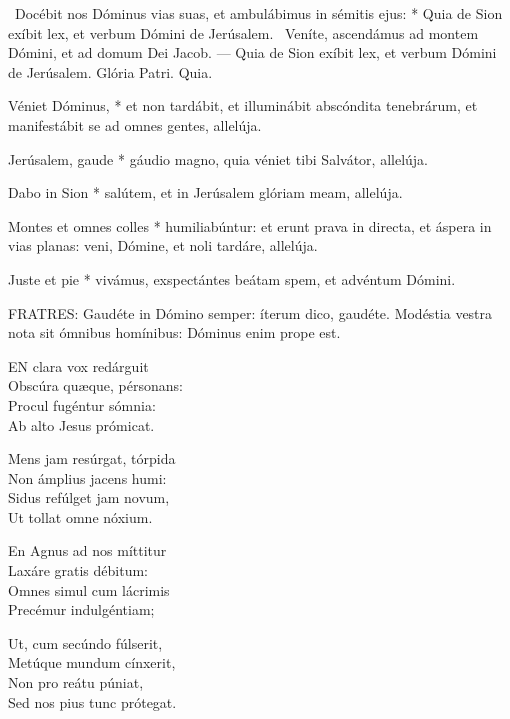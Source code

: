 \R\ Docébit nos Dóminus vias suas, et ambulábimus in sémitis ejus: * Quia de Sion exíbit lex, et verbum Dómini de Jerúsalem. \V\ Veníte, ascendámus ad montem Dómini, et ad domum Dei Jacob. --- Quia de Sion exíbit lex, et verbum Dómini de Jerúsalem. Glória Patri. Quia.



 Véniet Dóminus, * et non tardábit, et illuminábit abscóndita tenebrárum, et manifestábit se ad omnes gentes, allelúja.


 Jerúsalem, gaude * gáudio magno, quia véniet tibi Salvátor, allelúja.

 Dabo in Sion * salútem, et in Jerúsalem glóriam meam, allelúja.

 Montes et omnes colles * humiliabúntur: et erunt prava in directa, et áspera in vias planas: veni, Dómine, et noli tardáre, allelúja.

 Juste et pie * vivámus, exspectántes beátam spem, et advéntum Dómini.


\lettrine[lines=2]{F}{RATRES}: Gaudéte in Dómino semper: íterum dico, gaudéte. Modéstia vestra nota sit ómnibus homínibus: Dóminus enim prope est.


\lettrine[lines=2]{E}{N} clara vox redárguit\\
Obscúra quæque, pérsonans:\\
Procul fugéntur sómnia:\\
Ab alto Jesus prómicat.

Mens jam resúrgat, tórpida\\
Non ámplius jacens humi:\\
Sidus refúlget jam novum,\\
Ut tollat omne nóxium.

En Agnus ad nos míttitur\\
Laxáre gratis débitum:\\
Omnes simul cum lácrimis\\
Precémur indulgéntiam;

Ut, cum secúndo fúlserit,\\
Metúque mundum cínxerit,\\
Non pro reátu púniat,\\
Sed nos pius tunc prótegat.

